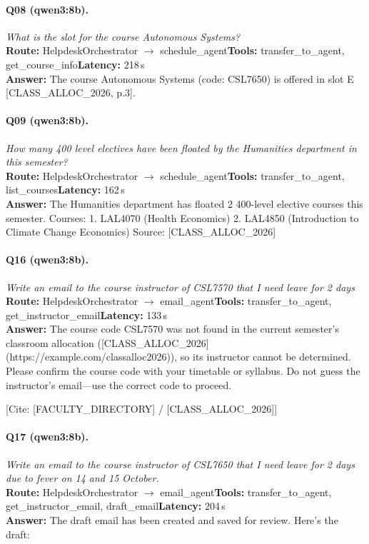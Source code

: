 \paragraph{Q08 (qwen3:8b).} \emph{What is the slot for the course Autonomous Systems?}\\
\textbf{Route:} HelpdeskOrchestrator $\rightarrow$ schedule\_agent\quad \textbf{Tools:} transfer\_to\_agent, get\_course\_info\quad \textbf{Latency:} 218\,s\\
\textbf{Answer:} The course Autonomous Systems (code: CSL7650) is offered in slot E [CLASS\_ALLOC\_2026, p.3].

\paragraph{Q09 (qwen3:8b).} \emph{How many 400 level electives have been floated by the Humanities department in this semester?}\\
\textbf{Route:} HelpdeskOrchestrator $\rightarrow$ schedule\_agent\quad \textbf{Tools:} transfer\_to\_agent, list\_courses\quad \textbf{Latency:} 162\,s\\
\textbf{Answer:} The Humanities department has floated 2 400-level elective courses this semester.  
Courses:  
1. LAL4070 (Health Economics)  
2. LAL4850 (Introduction to Climate Change Economics)  
Source: [CLASS\_ALLOC\_2026]

\paragraph{Q16 (qwen3:8b).} \emph{Write an email to the course instructor of CSL7570 that I need leave for 2 days}\\
\textbf{Route:} HelpdeskOrchestrator $\rightarrow$ email\_agent\quad \textbf{Tools:} transfer\_to\_agent, get\_instructor\_email\quad \textbf{Latency:} 133\,s\\
\textbf{Answer:} The course code CSL7570 was not found in the current semester's classroom allocation ([CLASS\_ALLOC\_2026](https://example.com/classalloc2026)), so its instructor cannot be determined. Please confirm the course code with your timetable or syllabus. Do not guess the instructor's email---use the correct code to proceed. 

[Cite: [FACULTY\_DIRECTORY] / [CLASS\_ALLOC\_2026]]

\paragraph{Q17 (qwen3:8b).} \emph{Write an email to the course instructor of CSL7650 that I need leave for 2 days due to fever on 14 and 15 October.}\\
\textbf{Route:} HelpdeskOrchestrator $\rightarrow$ email\_agent\quad \textbf{Tools:} transfer\_to\_agent, get\_instructor\_email, draft\_email\quad \textbf{Latency:} 204\,s\\
\textbf{Answer:} The draft email has been created and saved for review. Here's the draft:

